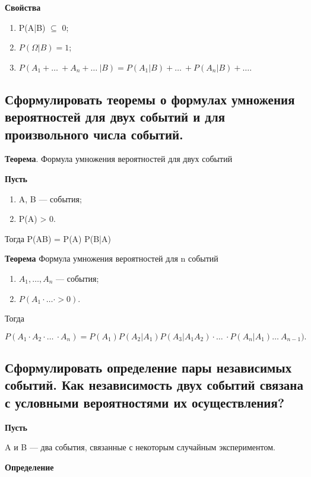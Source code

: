 \textbf{Свойства}

\begin{enumerate}
	\item P(A|B) $\subseteq$ 0;
	\item $P(\Omega|B) = 1$;
	\item $P(A_1 + \dots\ + A_n + \dots\ | B) = P(A_1|B) + \dots\ + P(A_n|B) + \dots$.
\end{enumerate}

\subsection{Сформулировать теоремы о формулах умножения вероятностей для двух событий и для произвольного числа событий.}

\textbf{Теорема}. Формула умножения вероятностей для двух событий 

\textbf{Пусть}

\begin{enumerate}
	\item A, B --- события;
	\item P(A) > 0.
\end{enumerate}

Тогда P(AB) = P(A) P(B|A)

\textbf{Теорема} Формула умножения вероятностей для n событий

\begin{enumerate}
	\item $A_1, \dots, A_n$ --- события;
	\item $P(A_1 \cdot \dots \cdot > 0)$.
\end{enumerate}

Тогда 

\begin{equation}
	P(A_1 \cdot A_2 \cdot \dots\ \cdot A_n)  = P(A_1) P(A_2 | A_1)P(A_3|A_1A_2) \cdot \dots\ \cdot P(A_n|A_1) \dots\   A_{n-1}).
\end{equation}

\subsection{Сформулировать определение пары независимых событий. Как независимость двух событий связана с условными вероятностями их осуществления?}

\textbf{Пусть}

A и B --- два события, связанные с некоторым случайным экспериментом.

\textbf{Определение}

